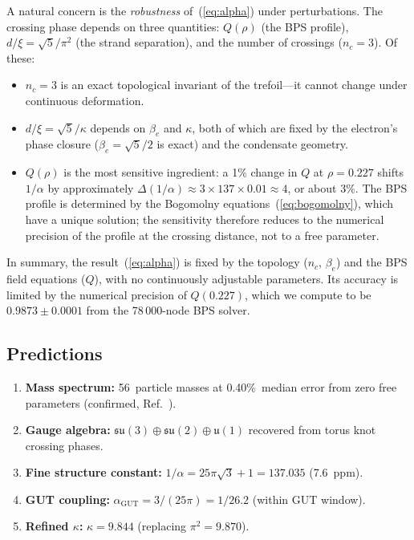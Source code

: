 \documentclass[11pt]{article}
\begin{document}
A natural concern is the \emph{robustness} of~(\ref{eq:alpha}) under
perturbations.  The crossing phase depends on three quantities:
$Q(\rho)$ (the BPS profile), $d/\xi = \sqrt{5}/\pi^2$ (the strand
separation), and the number of crossings ($n_c = 3$).  Of these:
\begin{itemize}
\item $n_c = 3$ is an exact topological invariant of the trefoil---it
      cannot change under continuous deformation.
\item $d/\xi = \sqrt{5}/\kappa$ depends on $\beta_e$ and $\kappa$,
      both of which are fixed by the electron's phase closure
      ($\beta_e = \sqrt{5}/2$ is exact) and the condensate geometry.
\item $Q(\rho)$ is the most sensitive ingredient: a 1\% change in
      $Q$ at $\rho = 0.227$ shifts $1/\alpha$ by approximately
      $\Delta(1/\alpha) \approx 3 \times 137 \times 0.01 \approx 4$,
      or about 3\%.  The BPS profile is determined by the Bogomolny
      equations~(\ref{eq:bogomolny}), which have a unique solution;
      the sensitivity therefore reduces to the numerical precision
      of the profile at the crossing distance, not to a free parameter.
\end{itemize}
In summary, the result~(\ref{eq:alpha}) is fixed by the topology
($n_c$, $\beta_e$) and the BPS field equations ($Q$), with no
continuously adjustable parameters.  Its accuracy is limited by the
numerical precision of $Q(0.227)$, which we compute to be
$0.9873 \pm 0.0001$ from the 78\,000-node BPS solver.

\subsection{Predictions}

\begin{enumerate}
\item \textbf{Mass spectrum:} 56~particle masses at 0.40\%~median
      error from zero free parameters (confirmed, Ref.~\cite{NWT6}).
\item \textbf{Gauge algebra:} $\mathfrak{su}(3)\oplus\mathfrak{su}(2)
      \oplus\mathfrak{u}(1)$ recovered from torus knot crossing phases.
\item \textbf{Fine structure constant:} $1/\alpha = 25\pi\sqrt{3}+1
      = 137.035$ (7.6~ppm).
\item \textbf{GUT coupling:} $\alpha_\text{GUT} = 3/(25\pi) =
      1/26.2$ (within GUT window).
\item \textbf{Refined $\kappa$:} $\kappa = 9.844$ (replacing
      $\pi^2 = 9.870$).
\end{enumerate}
\end{document}
